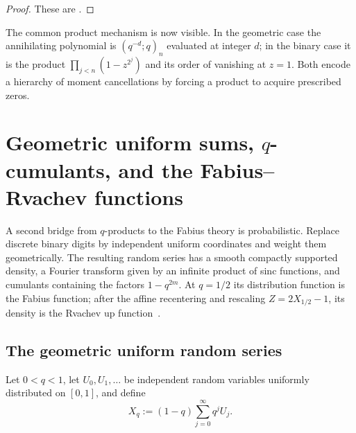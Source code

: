 \documentclass[11pt,a4paper,oneside,openany]{book}
\theoremstyle{definition}
\theoremstyle{remark}
\begin{document}
\begin{proof}
These are .
\end{proof}

The common product mechanism is now visible.  In the geometric case the annihilating polynomial is $(q^{-d};q)_n$ evaluated at integer $d$; in the binary case it is the product $\prod_{j<n}(1-z^{2^j})$ and its order of vanishing at $z=1$.  Both encode a hierarchy of moment cancellations by forcing a product to acquire prescribed zeros.

\chapter{Geometric uniform sums, \texorpdfstring{$q$}{q}-cumulants, and the Fabius--Rvachev functions}\label{chap:geometric-uniform-fabius}

A second bridge from $q$-products to the Fabius theory is probabilistic.  Replace discrete binary digits by independent uniform coordinates and weight them geometrically.  The resulting random series has a smooth compactly supported density, a Fourier transform given by an infinite product of sinc functions, and cumulants containing the factors $1-q^{2m}$.  At $q=1/2$ its distribution function is the Fabius function; after the affine recentering and rescaling $Z=2X_{1/2}-1$, its density is the Rvachev up function~\cite{Fabius1966,Rvachev1990,AriasDeReyna1982,ReshetnikovProveIt2026}.

\section{The geometric uniform random series}

Let $0<q<1$, let $U_0,U_1,\ldots$ be independent random variables uniformly distributed on $[0,1]$, and define
\begin{equation}\label{eq:geometric-uniform-series}
 X_q:=(1-q)\sum_{j=0}^{\infty}q^jU_j.
\end{equation}
\end{document}

